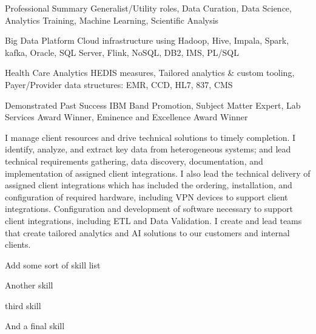 

\begin{cvskills}

  \cvskill
    {Professional Summary} %
    {Generalist/Utility roles, Data Curation, Data Science, Analytics Training, Machine Learning, Scientific Analysis} %

  \cvskill
    {Big Data Platform} %
    {Cloud infrastructure using Hadoop, Hive, Impala, Spark, kafka, Oracle, SQL Server, Flink, NoSQL, DB2, IMS, PL/SQL} %

  \cvskill
    {Health Care Analytics} %
    {HEDIS measures, Tailored analytics \& custom tooling, Payer/Provider data structures: EMR, CCD, HL7, 837, CMS} %

  \cvskill
    {Demonstrated Past Success} %
    {IBM Band Promotion, Subject Matter Expert, Lab Services Award Winner, Eminence and Excellence Award Winner} %

\end{cvskills}

\begin{cvparagraph}
  I manage client resources and drive technical solutions to timely completion.  I identify, analyze, and extract key data from heterogeneous systems; and lead technical requirements gathering, data discovery, documentation, and implementation of assigned client integrations.  I also lead the technical delivery of assigned client integrations which has included the ordering, installation, and configuration of required hardware, including VPN devices to support client integrations.  Configuration and development of software necessary to support client integrations, including ETL and Data Validation.  I create and lead teams that create tailored analytics and AI solutions to our customers and internal clients.
\end{cvparagraph}


\begin{cvcenterlist}
  \item {Add some sort of skill list}
  \item {Another skill}
  \item {third skill}
  \item {And a final skill}
\end{cvcenterlist}


